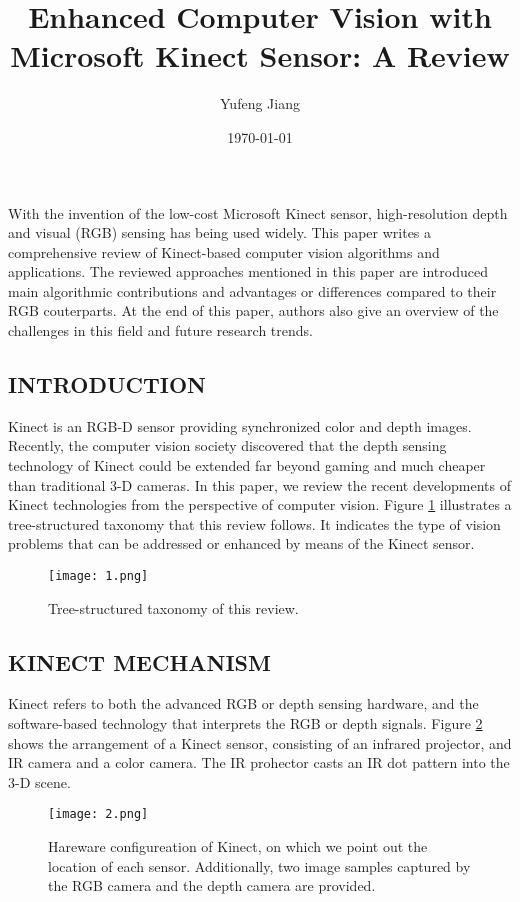 \documentclass[a4paper,11pt]{article}
\title{Enhanced Computer Vision with Microsoft Kinect Sensor: A Review}
\author{Yufeng Jiang}
\date{\today}
\begin{document}
\maketitle
\balance
With the invention of the low-cost Microsoft Kinect sensor, high-resolution depth and visual (RGB) sensing has being used widely. This paper writes a comprehensive review of Kinect-based computer vision algorithms and applications. The reviewed approaches mentioned in this paper are introduced main algorithmic contributions and advantages or differences compared to their RGB couterparts. At the end of this paper, authors also give an overview of the challenges in this field and future research trends.\\
\begin{multicols}{2}
\section{INTRODUCTION}
Kinect is an RGB-D sensor providing synchronized color and depth images. Recently, the computer vision society discovered that the depth sensing technology of Kinect could be extended far beyond gaming and much cheaper than traditional 3-D cameras. In this paper, we review the recent developments of Kinect technologies from the perspective of computer vision. Figure \ref{fig1} illustrates a tree-structured taxonomy that this review follows. It indicates the type of vision problems that can be addressed or enhanced by means of the Kinect sensor. \cite{Enhanced}\\
\end{multicols}
\begin{figure}[htbp]
\centering
\texttt{[image: 1.png]}
\caption{Tree-structured taxonomy of this review.}
\label{fig1}
\end{figure}
\begin{multicols}{2}
\section{KINECT MECHANISM}
Kinect refers to both the advanced RGB or depth sensing hardware, and the software-based technology that interprets the RGB or depth signals. Figure \ref{fig2} shows the arrangement of a Kinect sensor, consisting of an infrared projector, and IR camera and a color camera. The IR prohector casts an IR dot pattern into the 3-D scene. 
\end{multicols}
\begin{figure}[htbp]
\centering
\texttt{[image: 2.png]}
\caption{Hareware configureation of Kinect, on which we point out the location of each sensor. Additionally, two image samples captured by the RGB camera and the depth camera are provided.}
\label{fig2}
\end{figure}

\end{document}

